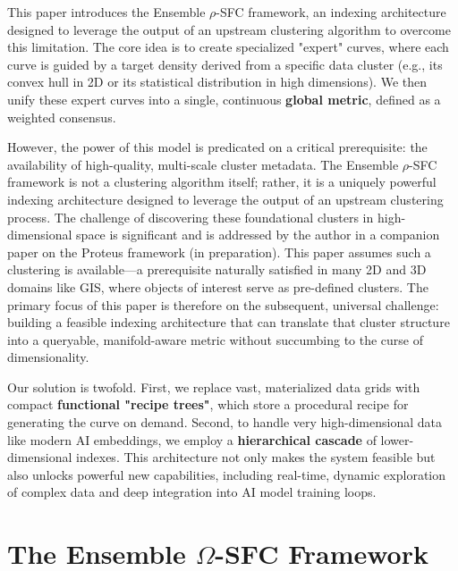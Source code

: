 \documentclass[sigconf]{acmart}
\begin{document}
This paper introduces the Ensemble $\rho$-SFC framework, an indexing architecture designed to leverage the output of an upstream clustering algorithm to overcome this limitation. The core idea is to create specialized "expert" curves, where each curve is guided by a target density derived from a specific data cluster (e.g., its convex hull in 2D or its statistical distribution in high dimensions). We then unify these expert curves into a single, continuous \textbf{global metric}, defined as a weighted consensus.

However, the power of this model is predicated on a critical prerequisite: the availability of high-quality, multi-scale cluster metadata. The Ensemble $\rho$-SFC framework is not a clustering algorithm itself; rather, it is a uniquely powerful indexing architecture designed to leverage the output of an upstream clustering process. The challenge of discovering these foundational clusters in high-dimensional space is significant and is addressed by the author in a companion paper on the Proteus framework (in preparation). This paper assumes such a clustering is available—a prerequisite naturally satisfied in many 2D and 3D domains like GIS, where objects of interest serve as pre-defined clusters. The primary focus of this paper is therefore on the subsequent, universal challenge: building a feasible indexing architecture that can translate that cluster structure into a queryable, manifold-aware metric without succumbing to the curse of dimensionality.

Our solution is twofold. First, we replace vast, materialized data grids with compact \textbf{functional "recipe trees"}, which store a procedural recipe for generating the curve on demand. Second, to handle very high-dimensional data like modern AI embeddings, we employ a \textbf{hierarchical cascade} of lower-dimensional indexes. This architecture not only makes the system feasible but also unlocks powerful new capabilities, including real-time, dynamic exploration of complex data and deep integration into AI model training loops.

\section{The Ensemble $\Omega$-SFC Framework}
\end{document}
